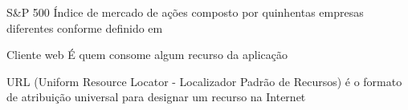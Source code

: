 \begin{siglas}
    \item[S\&P 500] Índice de mercado de ações composto por
                    quinhentas empresas diferentes conforme definido
                    em 

    \item[Cliente web] É quem consome algum recurso da aplicação
    
    \item[URL](Uniform Resource Locator - Localizador Padrão de Recursos) 
    é o formato de atribuição universal para designar um recurso na Internet
\end{siglas}
